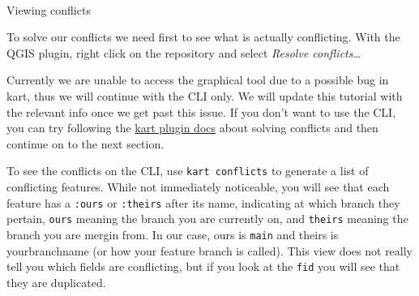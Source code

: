 \documentclass[
  letterpaper,
  DIV=11,
  numbers=noendperiod]{scrartcl}
\makeatletter
\let\oldparagraph\paragraph
\renewcommand{\paragraph}{
    \@ifstar
      \xxxParagraphStar
      \xxxParagraphNoStar
  }
\newcommand{\xxxParagraphStar}[1]{\oldparagraph*{#1}\mbox{}}
\newcommand{\xxxParagraphNoStar}[1]{\oldparagraph{#1}\mbox{}}
\makeatother
\begin{document}
\paragraph{Viewing conflicts}\label{viewing-conflicts}

To solve our conflicts we need first to see what is actually
conflicting. With the QGIS plugin, right click on the repository and
select \emph{Resolve conflicts\ldots{}}

\begin{tcolorbox}[enhanced jigsaw, arc=.35mm, colbacktitle=quarto-callout-note-color!10!white, colframe=quarto-callout-note-color-frame, coltitle=black, breakable, left=2mm, bottomrule=.15mm, rightrule=.15mm, opacitybacktitle=0.6, titlerule=0mm, opacityback=0, toptitle=1mm, title=\textcolor{quarto-callout-note-color}{\faInfo}\hspace{0.5em}{Note}, toprule=.15mm, bottomtitle=1mm, colback=white, leftrule=.75mm]

Currently we are unable to access the graphical tool due to a possible
bug in kart, thus we will continue with the CLI only. We will update
this tutorial with the relevant info once we get past this issue. If you
don't want to use the CLI, you can try following the
\href{https://github.com/koordinates/kart-qgis-plugin/blob/main/docs/index.md\#working-with-branches}{kart
plugin docs} about solving conflicts and then continue on to the next
section.

\end{tcolorbox}

To see the conflicts on the CLI, use \texttt{kart\ conflicts} to
generate a list of conflicting features. While not immediately
noticeable, you will see that each feature has a \texttt{:ours} or
\texttt{:theirs} after its name, indicating at which branch they
pertain, \texttt{ours} meaning the branch you are currently on, and
\texttt{theirs} meaning the branch you are mergin from. In our case,
ours is \texttt{main} and theirs is yourbranchname (or how your feature
branch is called). This view does not really tell you which fields are
conflicting, but if you look at the \texttt{fid} you will see that they
are duplicated.
\end{document}
